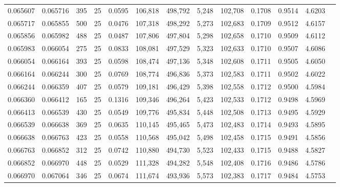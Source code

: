 \begin{tabular}{rrrrrrrrrrrrr}
0.065607 & 0.065716 &   395 &  25 &                                     0.0595 & 106,818 & 498,792 &   5,248 & 102,708 & 0.1708 & 0.9514 & 4.6203 \\
0.065717 & 0.065855 &   500 &  25 &                                     0.0476 & 107,318 & 498,292 &   5,273 & 102,683 & 0.1709 & 0.9512 & 4.6157 \\
0.065856 & 0.065982 &   488 &  25 &                                     0.0487 & 107,806 & 497,804 &   5,298 & 102,658 & 0.1710 & 0.9509 & 4.6112 \\
0.065983 & 0.066054 &   275 &  25 &                                     0.0833 & 108,081 & 497,529 &   5,323 & 102,633 & 0.1710 & 0.9507 & 4.6086 \\
0.066054 & 0.066164 &   393 &  25 &                                     0.0598 & 108,474 & 497,136 &   5,348 & 102,608 & 0.1711 & 0.9505 & 4.6050 \\
0.066164 & 0.066244 &   300 &  25 &                                     0.0769 & 108,774 & 496,836 &   5,373 & 102,583 & 0.1711 & 0.9502 & 4.6022 \\
0.066244 & 0.066359 &   407 &  25 &                                     0.0579 & 109,181 & 496,429 &   5,398 & 102,558 & 0.1712 & 0.9500 & 4.5984 \\
0.066360 & 0.066412 &   165 &  25 &                                     0.1316 & 109,346 & 496,264 &   5,423 & 102,533 & 0.1712 & 0.9498 & 4.5969 \\
0.066413 & 0.066539 &   430 &  25 &                                     0.0549 & 109,776 & 495,834 &   5,448 & 102,508 & 0.1713 & 0.9495 & 4.5929 \\
0.066539 & 0.066638 &   369 &  25 &                                     0.0635 & 110,145 & 495,465 &   5,473 & 102,483 & 0.1714 & 0.9493 & 4.5895 \\
0.066638 & 0.066763 &   423 &  25 &                                     0.0558 & 110,568 & 495,042 &   5,498 & 102,458 & 0.1715 & 0.9491 & 4.5856 \\
0.066763 & 0.066852 &   312 &  25 &                                     0.0742 & 110,880 & 494,730 &   5,523 & 102,433 & 0.1715 & 0.9488 & 4.5827 \\
0.066852 & 0.066970 &   448 &  25 &                                     0.0529 & 111,328 & 494,282 &   5,548 & 102,408 & 0.1716 & 0.9486 & 4.5786 \\
0.066970 & 0.067064 &   346 &  25 &                                     0.0674 & 111,674 & 493,936 &   5,573 & 102,383 & 0.1717 & 0.9484 & 4.5753 \\

\end{tabular}
